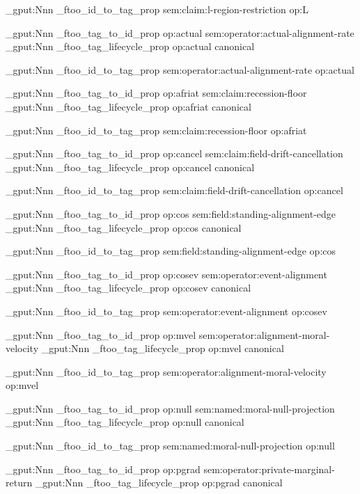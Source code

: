 \prop_gput:Nnn \g_ftoo_id_to_tag_prop { sem:claim:l-region-restriction } { op:L }


\prop_gput:Nnn \g_ftoo_tag_to_id_prop { op:actual } { sem:operator:actual-alignment-rate }
\prop_gput:Nnn \g_ftoo_tag_lifecycle_prop { op:actual } { canonical }

\prop_gput:Nnn \g_ftoo_id_to_tag_prop { sem:operator:actual-alignment-rate } { op:actual }


\prop_gput:Nnn \g_ftoo_tag_to_id_prop { op:afriat } { sem:claim:recession-floor }
\prop_gput:Nnn \g_ftoo_tag_lifecycle_prop { op:afriat } { canonical }

\prop_gput:Nnn \g_ftoo_id_to_tag_prop { sem:claim:recession-floor } { op:afriat }


\prop_gput:Nnn \g_ftoo_tag_to_id_prop { op:cancel } { sem:claim:field-drift-cancellation }
\prop_gput:Nnn \g_ftoo_tag_lifecycle_prop { op:cancel } { canonical }

\prop_gput:Nnn \g_ftoo_id_to_tag_prop { sem:claim:field-drift-cancellation } { op:cancel }


\prop_gput:Nnn \g_ftoo_tag_to_id_prop { op:cos } { sem:field:standing-alignment-edge }
\prop_gput:Nnn \g_ftoo_tag_lifecycle_prop { op:cos } { canonical }

\prop_gput:Nnn \g_ftoo_id_to_tag_prop { sem:field:standing-alignment-edge } { op:cos }


\prop_gput:Nnn \g_ftoo_tag_to_id_prop { op:cosev } { sem:operator:event-alignment }
\prop_gput:Nnn \g_ftoo_tag_lifecycle_prop { op:cosev } { canonical }

\prop_gput:Nnn \g_ftoo_id_to_tag_prop { sem:operator:event-alignment } { op:cosev }


\prop_gput:Nnn \g_ftoo_tag_to_id_prop { op:mvel } { sem:operator:alignment-moral-velocity }
\prop_gput:Nnn \g_ftoo_tag_lifecycle_prop { op:mvel } { canonical }

\prop_gput:Nnn \g_ftoo_id_to_tag_prop { sem:operator:alignment-moral-velocity } { op:mvel }


\prop_gput:Nnn \g_ftoo_tag_to_id_prop { op:null } { sem:named:moral-null-projection }
\prop_gput:Nnn \g_ftoo_tag_lifecycle_prop { op:null } { canonical }

\prop_gput:Nnn \g_ftoo_id_to_tag_prop { sem:named:moral-null-projection } { op:null }


\prop_gput:Nnn \g_ftoo_tag_to_id_prop { op:pgrad } { sem:operator:private-marginal-return }
\prop_gput:Nnn \g_ftoo_tag_lifecycle_prop { op:pgrad } { canonical }

